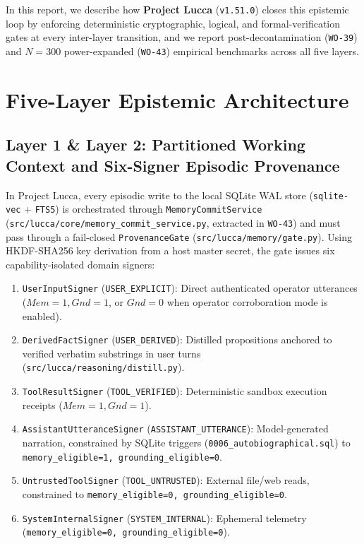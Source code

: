 \documentclass[11pt,a4paper]{article}
\begin{document}
In this report, we describe how \textbf{Project Lucca} (\texttt{v1.51.0}) closes this epistemic loop by enforcing deterministic cryptographic, logical, and formal-verification gates at every inter-layer transition, and we report post-decontamination (\texttt{WO-39}) and $N=300$ power-expanded (\texttt{WO-43}) empirical benchmarks across all five layers.

\section{Five-Layer Epistemic Architecture}

\subsection{Layer 1 \& Layer 2: Partitioned Working Context and Six-Signer Episodic Provenance}
In Project Lucca, every episodic write to the local SQLite WAL store (\texttt{sqlite-vec} + \texttt{FTS5}) is orchestrated through \texttt{MemoryCommitService} (\texttt{src/lucca/core/memory\_commit\_service.py}, extracted in \texttt{WO-43}) and must pass through a fail-closed \texttt{ProvenanceGate} (\texttt{src/lucca/memory/gate.py}). Using HKDF-SHA256 key derivation from a host master secret, the gate issues six capability-isolated domain signers:
\begin{enumerate}
    \item \texttt{UserInputSigner} (\texttt{USER\_EXPLICIT}): Direct authenticated operator utterances ($Mem=1, Gnd=1$, or $Gnd=0$ when operator corroboration mode is enabled).
    \item \texttt{DerivedFactSigner} (\texttt{USER\_DERIVED}): Distilled propositions anchored to verified verbatim substrings in user turns (\texttt{src/lucca/reasoning/distill.py}).
    \item \texttt{ToolResultSigner} (\texttt{TOOL\_VERIFIED}): Deterministic sandbox execution receipts ($Mem=1, Gnd=1$).
    \item \texttt{AssistantUtteranceSigner} (\texttt{ASSISTANT\_UTTERANCE}): Model-generated narration, constrained by SQLite triggers (\texttt{0006\_autobiographical.sql}) to \texttt{memory\_eligible=1, grounding\_eligible=0}.
    \item \texttt{UntrustedToolSigner} (\texttt{TOOL\_UNTRUSTED}): External file/web reads, constrained to \texttt{memory\_eligible=0, grounding\_eligible=0}.
    \item \texttt{SystemInternalSigner} (\texttt{SYSTEM\_INTERNAL}): Ephemeral telemetry (\texttt{memory\_eligible=0, grounding\_eligible=0}).
\end{enumerate}
\end{document}
